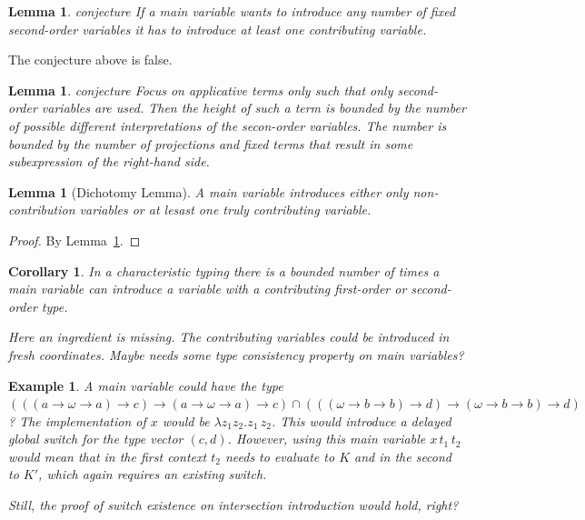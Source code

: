 \documentclass[10pt,a4paper]{article}
\theoremstyle{plain}%
\newtheorem{lemma}[theorem]{Lemma}
\newtheorem{corollary}[theorem]{Corollary}
\newtheorem{example}[theorem]{Example}
\begin{document}
\begin{lemma}
\label{lem:pseudo}
{\color{red} conjecture}
If a main variable wants to introduce any number of fixed second-order variables it \emph{has} to introduce at least one contributing variable.
\end{lemma}
The conjecture above is false.

\begin{lemma}
\label{lem:small-second-order}
{\color{red} conjecture}
Focus on applicative terms only such that only second-order variables are used. Then the height of such a term is bounded by the number of possible different interpretations of the secon-order variables. The number is bounded by the number of projections and fixed terms that result in some subexpression of the right-hand side.
\end{lemma}


\begin{lemma}[Dichotomy Lemma]
A main variable introduces either only non-contribution variables or at lesast one truly contributing variable.
\end{lemma}

\begin{proof}
By Lemma~\ref{lem:pseudo}.
\end{proof}

\begin{corollary}
In a characteristic typing there is a bounded number of times a main variable can introduce a variable with a contributing first-order or second-order type.

{\color{red}Here an ingredient is missing. The contributing variables could be introduced in fresh coordinates.
Maybe needs some type consistency property on main variables?}
\end{corollary}

\begin{example}
{\color{red}
A main variable could have the type $(((a \to \omega \to a) \to c) \to (a \to \omega \to a) \to c) \cap (((\omega \to b \to b) \to d) \to (\omega \to b \to b) \to d)$?}
The implementation of $x$ would be $\lambda z_1 z_2.z_1\,z_2$.
This would introduce a delayed global switch for the type vector $(c, d)$.
However, using this main variable $x\,t_1\,t_2$ would mean that in the first context $t_2$ needs to evaluate to $K$ and in the second to $K'$, which again requires an existing switch.

Still, the proof of switch existence on intersection introduction would hold, right?
\end{example}
\end{document}
